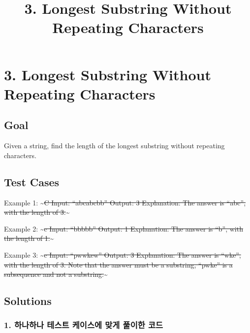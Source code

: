 \documentclass[11pt]{article}
\title{3. Longest Substring Without Repeating Characters}
\begin{document}
    
    
    \maketitle
    
    

    
    \hypertarget{longest-substring-without-repeating-characters}{%
\section{3. Longest Substring Without Repeating
Characters}\label{longest-substring-without-repeating-characters}}

\hypertarget{goal}{%
\subsection{Goal}\label{goal}}

Given a string, find the length of the longest substring without
repeating characters.

\hypertarget{test-cases}{%
\subsection{Test Cases}\label{test-cases}}

Example 1: \textasciitilde{}\sout{C Input: ``abcabcbb'' Output: 3
Explanation: The answer is ``abc'', with the length of
3.}\textasciitilde{}

Example 2: \textasciitilde{}\sout{c Input: ``bbbbb'' Output: 1
Explanation: The answer is ``b'', with the length of
1.}\textasciitilde{}

Example 3: \textasciitilde{}\sout{c Input: ``pwwkew'' Output: 3
Explanation: The answer is ``wke'', with the length of 3. Note that the
answer must be a substring, ``pwke'' is a subsequence and not a
substring.}\textasciitilde{}

\hypertarget{solutions}{%
\subsection{Solutions}\label{solutions}}

\hypertarget{uxd558uxb098uxd558uxb098-uxd14cuxc2a4uxd2b8-uxcf00uxc774uxc2a4uxc5d0-uxb9deuxac8c-uxd480uxc774uxd55c-uxcf54uxb4dc}{%
\subsubsection{1. 하나하나 테스트 케이스에 맞게 풀이한
코드}\label{uxd558uxb098uxd558uxb098-uxd14cuxc2a4uxd2b8-uxcf00uxc774uxc2a4uxc5d0-uxb9deuxac8c-uxd480uxc774uxd55c-uxcf54uxb4dc}}
\end{document}
